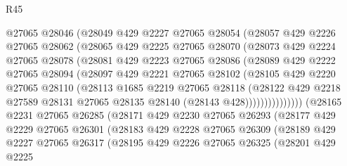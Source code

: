 \begin{lexlean}{R45}
\begin{coremodule}
                @27065
                @28046
                (@28049
                  @429
                  @2227
                  @27065
                  @28054
                  (@28057
                    @429
                    @2226
                    @27065
                    @28062
                    (@28065
                      @429
                      @2225
                      @27065
                      @28070
                      (@28073
                        @429
                        @2224
                        @27065
                        @28078
                        (@28081
                          @429
                          @2223
                          @27065
                          @28086
                          (@28089
                            @429
                            @2222
                            @27065
                            @28094
                            (@28097
                              @429
                              @2221
                              @27065
                              @28102
                              (@28105
                                @429
                                @2220
                                @27065
                                @28110
                                (@28113
                                  @1685
                                  @2219
                                  @27065
                                  @28118
                                  (@28122
                                    @429
                                    @2218
                                    @27589
                                    @28131
                                    @27065
                                    @28135
                                    @28140
                                    (@28143 @428)))))))))))))))
        (@28165
          @2231
          @27065
          @26285
          (@28171
            @429
            @2230
            @27065
            @26293
            (@28177
              @429
              @2229
              @27065
              @26301
              (@28183
                @429
                @2228
                @27065
                @26309
                (@28189
                  @429
                  @2227
                  @27065
                  @26317
                  (@28195
                    @429
                    @2226
                    @27065
                    @26325
                    (@28201
                      @429
                      @2225

\end{coremodule}
\end{lexlean}

